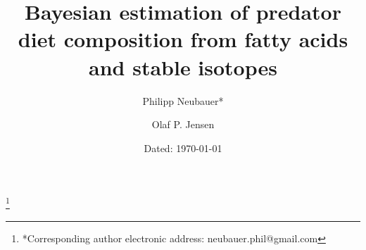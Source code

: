 \documentclass{article}%
\begin{document}
%

\begin{titlepage}%
\title{Bayesian estimation of predator diet composition from fatty
  acids and stable isotopes}%
\renewcommand\footnotemark{}

\author{Philipp Neubauer*}\thanks{*Corresponding author electronic address: neubauer.phil@gmail.com}%
%

\author{Olaf P. Jensen}%
%

\date{Dated: \today}%

\maketitle%

\end{titlepage}
\end{document}
